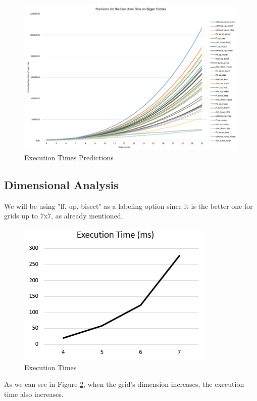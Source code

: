 \documentclass[runningheads]{llncs}
\begin{document}
\begin{figure}
    \centering
    \includegraphics[width=\textwidth]{img/previsions.png}
    \caption{Execution Times Predictions} \label{fig4}
\end{figure}

\subsection{Dimensional Analysis}

We will be using "ff, up, bisect" as a labeling option since it
    is the better one for grids up to 7x7, as already mentioned.

\begin{figure}
    \centering
    \includegraphics[scale=0.7]{img/dimensional_analysis.png}
    \caption{Execution Times} \label{fig5}
\end{figure}

As we can see in Figure \ref{fig5}, when the grid's dimension increases,
    the execution time also increases.
\end{document}
